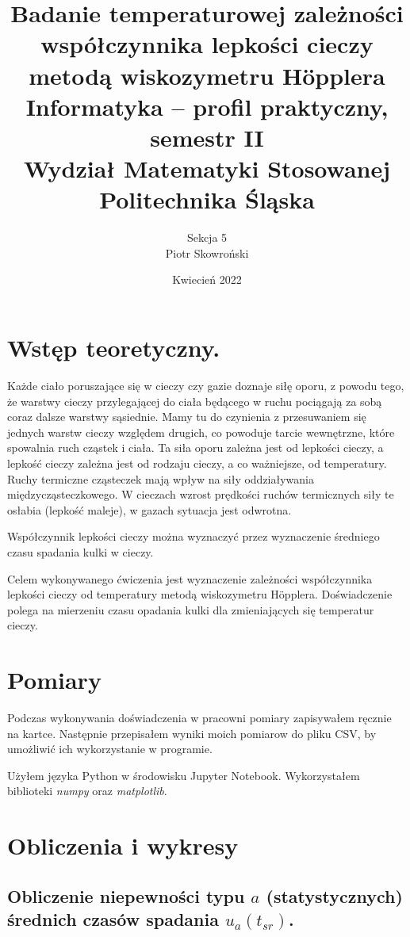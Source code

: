 \documentclass[12pt]{article}
\title{ Badanie temperaturowej zależności współczynnika 
    lepkości cieczy metodą wiskozymetru Höpplera \\
    \large Informatyka – profil praktyczny, semestr II \\
    Wydział Matematyki Stosowanej \\
    Politechnika Śląska \\}
\author{ Sekcja 5 \\
    Piotr Skowroński}
\date{Kwiecień 2022}
\begin{document}
\maketitle

\section{Wstęp teoretyczny.}
Każde ciało poruszające się w cieczy czy gazie doznaje
siłę oporu, z powodu tego, że warstwy cieczy przylegającej do ciała
będącego w ruchu pociągają za sobą coraz dalsze warstwy sąsiednie.
Mamy tu do czynienia z przesuwaniem się jednych warstw cieczy względem
drugich, co powoduje tarcie wewnętrzne, które spowalnia ruch cząstek i ciała.
Ta siła oporu zależna jest od lepkości cieczy, a lepkość cieczy zależna
jest od rodzaju cieczy, a co ważniejsze, od temperatury. Ruchy termiczne 
cząsteczek mają wpływ na siły oddziaływania międzycząsteczkowego. 
W cieczach wzrost prędkości ruchów termicznych siły te osłabia (lepkość maleje),
w gazach sytuacja jest odwrotna.

Współczynnik lepkości cieczy można wyznaczyć przez wyznaczenie średniego czasu 
spadania kulki w cieczy.

Celem wykonywanego ćwiczenia jest  wyznaczenie zależności współczynnika 
lepkości cieczy od temperatury metodą wiskozymetru Höpplera. Doświadczenie 
polega na mierzeniu czasu opadania kulki dla zmieniających się temperatur cieczy.
\section{Pomiary}

Podczas wykonywania doświadczenia w pracowni pomiary zapisywałem ręcznie na
kartce. Następnie przepisałem wyniki moich pomiarow do pliku CSV, by
umożliwić ich wykorzystanie w programie.

Użyłem języka Python w środowisku Jupyter Notebook. Wykorzystałem biblioteki
\textit{numpy} oraz \textit{matplotlib}.

\section{Obliczenia i wykresy}

\subsection*{Obliczenie niepewności typu $a$ (statystycznych) średnich czasów spadania $u_a(t_{sr})$.}
\end{document}
